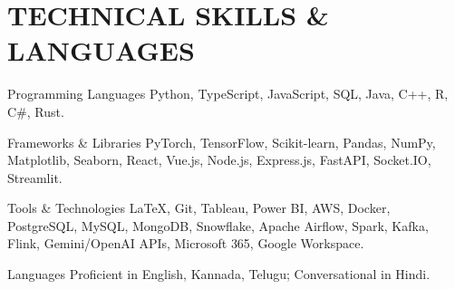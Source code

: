 \documentclass[10pt, letterpaper]{article}
\begin{document}
\section{TECHNICAL SKILLS \& LANGUAGES}

\begin{skillcategory}{Programming Languages}
	Python, TypeScript, JavaScript, SQL, Java, C++, R, C\#, Rust.
\end{skillcategory}

\begin{skillcategory}{Frameworks \& Libraries}
	PyTorch, TensorFlow, Scikit-learn, Pandas, NumPy, Matplotlib, Seaborn, React, Vue.js, Node.js, Express.js, FastAPI, Socket.IO, Streamlit.
\end{skillcategory}

\begin{skillcategory}{Tools \& Technologies}
	\LaTeX, Git, Tableau, Power BI, AWS, Docker, PostgreSQL, MySQL, MongoDB, Snowflake, Apache Airflow, Spark, Kafka, Flink, Gemini/OpenAI APIs, Microsoft 365, Google Workspace.
\end{skillcategory}

\begin{skillcategory}{Languages}
	Proficient in English, Kannada, Telugu; Conversational in Hindi.
\end{skillcategory}

\end{document}
